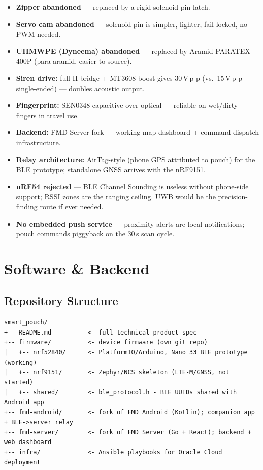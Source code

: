 \documentclass[11pt,a4paper]{article}
\begin{document}
\begin{itemize}
  \item \textbf{Zipper abandoned} --- replaced by a rigid solenoid pin latch.
  \item \textbf{Servo cam abandoned} --- solenoid pin is simpler, lighter, fail-locked, no PWM needed.
  \item \textbf{UHMWPE (Dyneema) abandoned} --- replaced by Aramid PARATEX 400P (para-aramid, easier to source).
  \item \textbf{Siren drive:} full H-bridge + MT3608 boost gives 30\,V\,p-p (vs.\ 15\,V\,p-p single-ended) --- doubles acoustic output.
  \item \textbf{Fingerprint:} SEN0348 capacitive over optical --- reliable on wet/dirty fingers in travel use.
  \item \textbf{Backend:} FMD Server fork --- working map dashboard + command dispatch infrastructure.
  \item \textbf{Relay architecture:} AirTag-style (phone GPS attributed to pouch) for the BLE prototype; standalone GNSS arrives with the nRF9151.
  \item \textbf{nRF54 rejected} --- BLE Channel Sounding is useless without phone-side support; RSSI zones are the ranging ceiling. UWB would be the precision-finding route if ever needed.
  \item \textbf{No embedded push service} --- proximity alerts are local notifications; pouch commands piggyback on the 30\,s scan cycle.
\end{itemize}

\section{Software \& Backend}

\subsection{Repository Structure}

\begin{Verbatim}[frame=single,fontsize=\small]
smart_pouch/
+-- README.md          <- full technical product spec
+-- firmware/          <- device firmware (own git repo)
|   +-- nrf52840/      <- PlatformIO/Arduino, Nano 33 BLE prototype (working)
|   +-- nrf9151/       <- Zephyr/NCS skeleton (LTE-M/GNSS, not started)
|   +-- shared/        <- ble_protocol.h - BLE UUIDs shared with Android app
+-- fmd-android/       <- fork of FMD Android (Kotlin); companion app + BLE->server relay
+-- fmd-server/        <- fork of FMD Server (Go + React); backend + web dashboard
+-- infra/             <- Ansible playbooks for Oracle Cloud deployment
\end{Verbatim}
\end{document}
